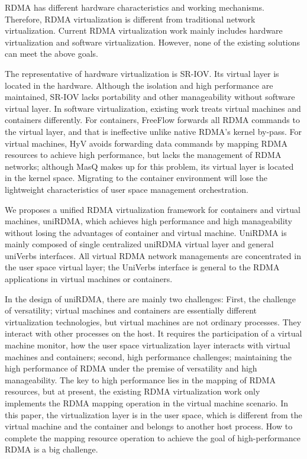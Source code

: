 \documentclass[sigplan,screen]{acmart}
\begin{document}
RDMA has different hardware characteristics and working mechanisms. Therefore, RDMA virtualization is different from traditional network virtualization. Current RDMA virtualization work mainly includes hardware virtualization and software virtualization. However, none of the existing solutions can meet the above goals.

The representative of hardware virtualization is SR-IOV. Its virtual layer is located in the hardware. Although the isolation and high performance are maintained,  SR-IOV lacks portability and other manageability without software virtual layer. In software virtualization, existing work treats virtual machines and containers differently. For containers, FreeFlow forwards all RDMA commands to the virtual layer, and that is ineffective unlike native RDMA's kernel by-pass. For virtual machines, HyV avoids forwarding data commands by mapping RDMA resources to achieve high performance, but lacks the management of RDMA networks; although MasQ makes up for this problem, its virtual layer is located in the kernel space. Migrating to the container environment will lose the lightweight characteristics of user space management orchestration.

We proposes a unified RDMA virtualization framework for containers and virtual machines, uniRDMA, which achieves high performance and high manageability without losing the advantages of container and virtual machine. UniRDMA is mainly composed of single centralized uniRDMA virtual layer and general uniVerbs interfaces. All virtual RDMA network managements are concentrated in the user space virtual layer; the UniVerbs interface is general to the RDMA applications in virtual machines or containers.

In the design of uniRDMA, there are mainly two challenges: First, the challenge of versatility; virtual machines and containers are essentially different virtualization technologies, but virtual machines are not ordinary processes. They interact with other processes on the host. It requires the participation of a virtual machine monitor, how the user space virtualization layer interacts with virtual machines and containers; second, high performance challenges; maintaining the high performance of RDMA under the premise of versatility and high manageability. The key to high performance lies in the mapping of RDMA resources, but at present, the existing RDMA virtualization work only implements the RDMA mapping operation in the virtual machine scenario. In this paper, the virtualization layer is in the user space, which is different from the virtual machine and the container and belongs to another host process. How to complete the mapping resource operation to achieve the goal of high-performance RDMA is a big challenge.
\end{document}
